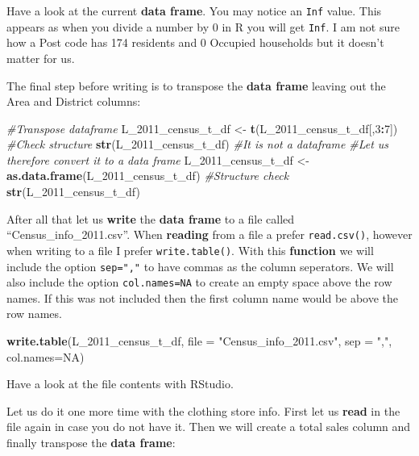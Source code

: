 \documentclass[]{book}
\newenvironment{Shaded}{\begin{snugshade}}{\end{snugshade}}
\newcommand{\KeywordTok}[1]{\textcolor[rgb]{0.13,0.29,0.53}{\textbf{#1}}}
\newcommand{\DataTypeTok}[1]{\textcolor[rgb]{0.13,0.29,0.53}{#1}}
\newcommand{\DecValTok}[1]{\textcolor[rgb]{0.00,0.00,0.81}{#1}}
\newcommand{\StringTok}[1]{\textcolor[rgb]{0.31,0.60,0.02}{#1}}
\newcommand{\CommentTok}[1]{\textcolor[rgb]{0.56,0.35,0.01}{\textit{#1}}}
\newcommand{\OtherTok}[1]{\textcolor[rgb]{0.56,0.35,0.01}{#1}}
\newcommand{\OperatorTok}[1]{\textcolor[rgb]{0.81,0.36,0.00}{\textbf{#1}}}
\newcommand{\NormalTok}[1]{#1}
\begin{document}
Have a look at the current \textbf{data frame}. You may notice an
\texttt{Inf} value. This appears as when you divide a number by 0 in R
you will get \texttt{Inf}. I am not sure how a Post code has 174
residents and 0 Occupied households but it doesn't matter for us.

The final step before writing is to transpose the \textbf{data frame}
leaving out the Area and District columns:

\begin{Shaded}
\begin{Highlighting}[]
\CommentTok{#Transpose dataframe}
\NormalTok{L_2011_census_t_df <-}\StringTok{ }\KeywordTok{t}\NormalTok{(L_2011_census_t_df[,}\DecValTok{3}\OperatorTok{:}\DecValTok{7}\NormalTok{])}
\CommentTok{#Check structure}
\KeywordTok{str}\NormalTok{(L_2011_census_t_df)}
\CommentTok{#It is not a dataframe}
\CommentTok{#Let us therefore convert it to a data frame}
\NormalTok{L_2011_census_t_df <-}\StringTok{ }\KeywordTok{as.data.frame}\NormalTok{(L_2011_census_t_df)}
\CommentTok{#Structure check}
\KeywordTok{str}\NormalTok{(L_2011_census_t_df)}
\end{Highlighting}
\end{Shaded}

After all that let us \textbf{write} the \textbf{data frame} to a file
called ``Census\_info\_2011.csv''. When \textbf{reading} from a file a
prefer \texttt{read.csv()}, however when writing to a file I prefer
\texttt{write.table()}. With this \textbf{function} we will include the
option \texttt{sep=","} to have commas as the column seperators. We will
also include the option \texttt{col.names=NA} to create an empty space
above the row names. If this was not included then the first column name
would be above the row names.

\begin{Shaded}
\begin{Highlighting}[]
\KeywordTok{write.table}\NormalTok{(L_2011_census_t_df, }\DataTypeTok{file =} \StringTok{"Census_info_2011.csv"}\NormalTok{, }\DataTypeTok{sep =} \StringTok{","}\NormalTok{, }\DataTypeTok{col.names=}\OtherTok{NA}\NormalTok{)}
\end{Highlighting}
\end{Shaded}

Have a look at the file contents with RStudio.

Let us do it one more time with the clothing store info. First let us
\textbf{read} in the file again in case you do not have it. Then we will
create a total sales column and finally transpose the \textbf{data
frame}:
\end{document}

